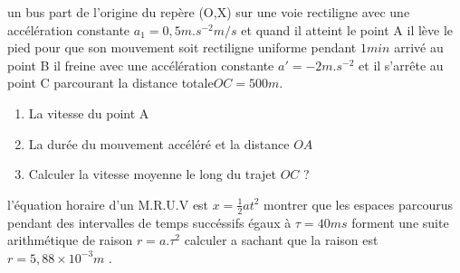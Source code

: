 \documentclass[10pt,a4paper]{article}
\begin{document}
\begin{tcolorbox}[sabour,title=EXERCICE 4]
un bus part de l'origine du repère (O,X) sur une voie rectiligne avec une accélération constante  $a_1=0,5m.s^{-2}m/s$ et quand il atteint le point A il lève le pied pour que son mouvement soit rectiligne uniforme pendant $1min$ arrivé au point B il freine avec une accélération constante $a'=-2m.s^{-2}$ et il s'arrête au point C parcourant la distance totale$ OC=500m$.
\begin{enumerate}
\item La vitesse du point A 
\item La durée du mouvement accéléré et la distance $OA$
\item Calculer la vitesse moyenne le long du trajet $OC$ ?
\end{enumerate}
\end{tcolorbox}
\begin{tcolorbox}[sabour,title=EXERCICE 5]
l'équation horaire d'un M.R.U.V est $x=\frac{1}{2}at^2$
montrer que les espaces parcourus pendant des intervalles de temps succéssifs égaux à $\tau = 40ms $ forment une suite arithmétique 
de raison $r=a.\tau^2$ calculer a sachant que la raison est $r=5,88\times10^{-3}m$ .



\end{tcolorbox}
\end{document}
